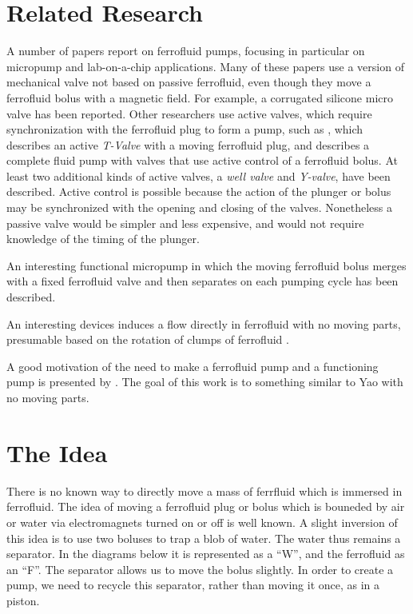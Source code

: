 \documentclass[12pt]{article}
\begin{document}
\section{Related Research}

A number of papers report on ferrofluid pumps, focusing in particular
on micropump and lab-on-a-chip applications\cite{ozbey2015modeling,hsu2018biocompatible}.
Many of these papers use
a version of mechanical valve not based on passive
ferrofluid, even though they move a ferrofluid bolus
with a magnetic field.
For example,
a corrugated silicone micro valve\cite{yamahata2003ferrofluid,yamahata2005plastic}
has been reported.
Other researchers use active valves, which require synchronization with
the ferrofluid plug to form a pump,
such as \cite{menz2000fluidic}, which
describes an active {\em T-Valve} with a moving ferrofluid plug, and
\cite{ando2009ferrofluidic} describes a complete fluid pump with valves
that use
active control of a ferrofluid bolus.
At least two additional kinds of active valves, a {\em well valve} and
{\em Y-valve}, have
been described\cite{hartshorne2004ferrofluid}.
Active control is possible because the
action of the plunger or bolus may be synchronized with the opening and closing
of the valves.
Nonetheless a passive valve would be simpler and less
expensive, and would not require knowledge of the timing of the
plunger.

An interesting functional micropump in which the
moving ferrofluid bolus merges with a fixed ferrofluid valve and then
separates on each pumping cycle has been described\cite{hatch2001ferrofluidic}.

An interesting devices induces a flow directly in ferrofluid
with no moving parts,
presumable based on the rotation of clumps of ferrofluid
\cite{mao2011direct}.

A good motivation of the need to make a ferrofluid pump and a functioning pump
is presented by \cite{YAO2024115537}. The goal of this work is to something similar
to Yao with no moving parts.

\section{The Idea}

There is no known way to directly move a mass of ferrfluid which is immersed in
ferrofluid.
The idea of moving a ferrofluid plug or bolus which is bouneded by air or water
via electromagnets turned on or off is well known. A slight inversion of this
idea is to use two boluses to trap a blob of water. The water thus remains
a separator. In the diagrams below it is represented as a ``W'',
and the ferrofluid as an ``F''.
The separator allows us to move the bolus slightly.
In order to create a pump, we need to recycle this separator, rather than
moving it once, as in a piston.
\end{document}
